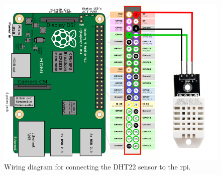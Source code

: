 \begin{figure}[H]
    \centering
   \includegraphics[width=\imageWidth\textwidth]{assets/rpi_wiring.png}
    \caption{\label{fig:rpi_wiring} Wiring diagram for connecting the DHT22 sensor to the \gls{rpi}.}
\end{figure}